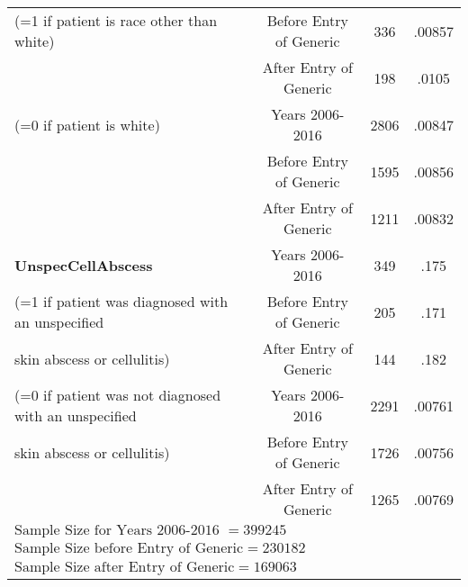\begin{tabular}{l*{3}{c}}
(=1 if patient is race other than white)                &     Before Entry of Generic&     336&      .00857\\
                                                        &     After Entry of Generic&      198&      .0105\\
[1em]
(=0 if patient is white)                                &     Years 2006-2016&             2806&      .00847\\
                                                        &     Before Entry of Generic&     1595&      .00856\\
                                                        &     After Entry of Generic&      1211&      .00832\\
[1em]
\textbf{UnspecCellAbscess}                              &     Years 2006-2016&             349 &      .175\\
(=1 if patient was diagnosed with an unspecified        &     Before Entry of Generic&     205 &      .171\\
 skin abscess or cellulitis)                            &     After Entry of Generic&      144  &      .182\\
[1em]
(=0 if patient was not diagnosed with an unspecified    &     Years 2006-2016&             2291 &      .00761\\
skin abscess or cellulitis)                             &     Before Entry of Generic&     1726 &      .00756\\
                                                        &     After Entry of Generic&      1265  &      .00769\\
\hline
$\text{Sample Size for Years 2006-2016 }= 399245$\\
$\text{Sample Size before Entry of Generic} = 230182$\\
$\text{Sample Size after Entry of Generic} = 169063$\\
\hline\hline
\end{tabular}


